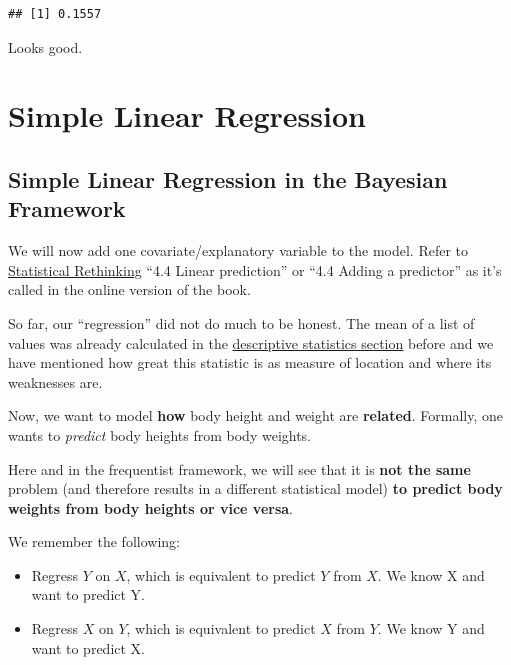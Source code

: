 \documentclass[
]{book}
\providecommand{\tightlist}{%
  \setlength{\itemsep}{0pt}\setlength{\parskip}{0pt}}
\begin{document}
\begin{verbatim}
## [1] 0.1557
\end{verbatim}

Looks good.

\chapter{Simple Linear Regression}\label{simple-linear-regression}

\section{Simple Linear Regression in the Bayesian Framework}\label{simple_lin_reg_bayes}

We will now add one covariate/explanatory variable to the model.
Refer to \href{https://civil.colorado.edu/~balajir/CVEN6833/bayes-resources/RM-StatRethink-Bayes.pdf}{Statistical Rethinking}
``4.4 Linear prediction'' or ``4.4 Adding a predictor'' as it's called in the online version of the book.

So far, our ``regression'' did not do much to be honest. The mean of a list of values
was already calculated in the \href{https://jdegenfellner.github.io/Script_QM1_ZHAW/descriptive_stats.html}{descriptive statistics section}
before and we have mentioned how great this statistic is as measure of location and where its weaknesses are.

Now, we want to model \textbf{how} body height and weight are \textbf{related}.
Formally, one wants to \emph{predict} body heights from body weights.

Here and in the frequentist framework, we will see that it is \textbf{not the same}
problem (and therefore results in a different statistical model)
\textbf{to predict body weights from body heights or vice versa}.

We remember the following:

\begin{itemize}
\tightlist
\item
  Regress \(Y\) on \(X\), which is equivalent to predict \(Y\) from \(X\).
  We know X and want to predict Y.
\item
  Regress \(X\) on \(Y\), which is equivalent to predict \(X\) from \(Y\).
  We know Y and want to predict X.
\end{itemize}
\end{document}
